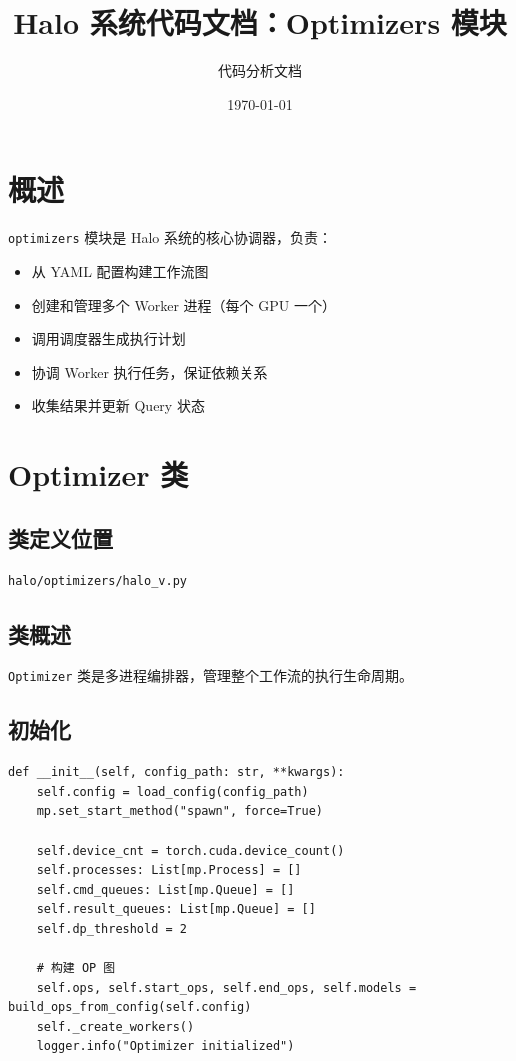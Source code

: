 \documentclass[12pt,a4paper]{article}
\title{Halo 系统代码文档：Optimizers 模块}
\author{代码分析文档}
\date{\today}
\begin{document}
\maketitle

\tableofcontents
\newpage

\section{概述}

\texttt{optimizers} 模块是 Halo 系统的核心协调器，负责：
\begin{itemize}
    \item 从 YAML 配置构建工作流图
    \item 创建和管理多个 Worker 进程（每个 GPU 一个）
    \item 调用调度器生成执行计划
    \item 协调 Worker 执行任务，保证依赖关系
    \item 收集结果并更新 Query 状态
\end{itemize}

\section{Optimizer 类}

\subsection{类定义位置}
\texttt{halo/optimizers/halo\_v.py}

\subsection{类概述}

\texttt{Optimizer} 类是多进程编排器，管理整个工作流的执行生命周期。

\subsection{初始化}

\begin{lstlisting}
def __init__(self, config_path: str, **kwargs):
    self.config = load_config(config_path)
    mp.set_start_method("spawn", force=True)
    
    self.device_cnt = torch.cuda.device_count()
    self.processes: List[mp.Process] = []
    self.cmd_queues: List[mp.Queue] = []
    self.result_queues: List[mp.Queue] = []
    self.dp_threshold = 2
    
    # 构建 OP 图
    self.ops, self.start_ops, self.end_ops, self.models = build_ops_from_config(self.config)
    self._create_workers()
    logger.info("Optimizer initialized")
\end{lstlisting}
\end{document}
